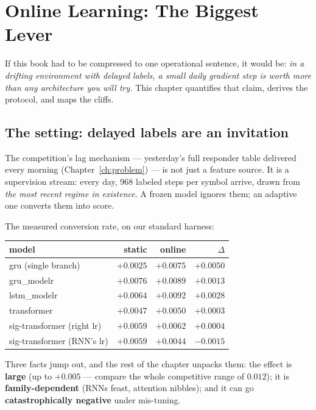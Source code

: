 \chapter{Online Learning: The Biggest Lever}
\label{ch:online}

If this book had to be compressed to one operational sentence, it would be:
\emph{in a drifting environment with delayed labels, a small daily gradient
step is worth more than any architecture you will try.} This chapter
quantifies that claim, derives the protocol, and maps the cliffs.

\section{The setting: delayed labels are an invitation}

The competition's lag mechanism --- yesterday's full responder table
delivered every morning (Chapter~\ref{ch:problem}) --- is not just a
feature source. It is a supervision stream: every day, 968 labeled steps
per symbol arrive, drawn from \emph{the most recent regime in existence}.
A frozen model ignores them; an adaptive one converts them into score.

The measured conversion rate, on our standard harness:

\begin{center}
\begin{tabular}{@{}lrrr@{}}
\toprule
model & static & online & $\Delta$ \\
\midrule
gru (single branch) & $+0.0025$ & $+0.0075$ & $+0.0050$ \\
gru\_modelr & $+0.0076$ & $+0.0089$ & $+0.0013$ \\
lstm\_modelr & $+0.0064$ & $+0.0092$ & $+0.0028$ \\
transformer & $+0.0047$ & $+0.0050$ & $+0.0003$ \\
sig-transformer (right lr) & $+0.0059$ & $+0.0062$ & $+0.0004$ \\
sig-transformer (RNN's lr) & $+0.0059$ & $+0.0044$ & $\bm{-0.0015}$ \\
\bottomrule
\end{tabular}
\end{center}

Three facts jump out, and the rest of the chapter unpacks them: the effect
is \textbf{large} (up to $+0.005$ --- compare the whole competitive range
of $0.012$); it is \textbf{family-dependent} (RNNs feast, attention
nibbles); and it can go \textbf{catastrophically negative} under
mis-tuning.

